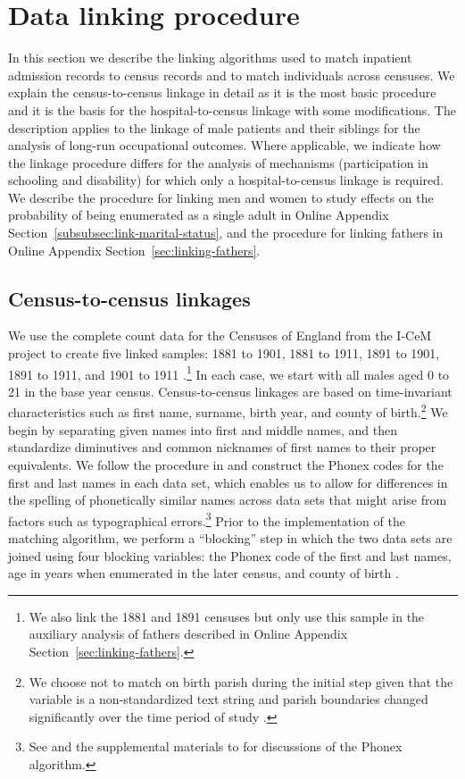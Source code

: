 \documentclass[12pt,english]{article}
\begin{document}
\section{Data linking procedure\label{sec:linking-procedure}}

In this section we describe the linking algorithms used to match inpatient admission records to census records and to match individuals across censuses. We explain the census-to-census linkage in detail as it is the most basic procedure and it is the basis for the hospital-to-census linkage with some modifications. The description applies to the linkage of male patients and their siblings for the analysis of long-run occupational outcomes. Where applicable, we indicate how the linkage procedure differs for the analysis of mechanisms (participation in schooling and disability) for which only a hospital-to-census linkage is required. We describe the procedure for linking men and women to study effects on the probability of being enumerated as a single adult in Online Appendix Section~\ref{subsubsec:link-marital-status}, and the procedure for linking fathers in Online Appendix Section~\ref{sec:linking-fathers}.

\subsection[Census-to-census linkages]{Census-to-census linkages\label{sec:linking-census-census}}

We use the complete count data for the Censuses of England from the I-CeM project to create five linked samples: 1881 to 1901, 1881 to 1911, 1891 to 1901, 1891 to 1911, and 1901 to 1911 \citep{SchurerHiggs2020,SchurerHiggs2022}.\footnote{We also link the 1881 and 1891 censuses but only use this sample in the auxiliary analysis of fathers described in Online Appendix Section~\ref{sec:linking-fathers}.} In each case, we start with all males aged 0 to 21 in the base year census. Census-to-census linkages are based on time-invariant characteristics such as first name, surname, birth year, and county of birth.\footnote{We choose not to match on birth parish during the initial step given that the variable is a non-standardized text string and parish boundaries changed significantly over the time period of study \citep{SchurerDay2019}.} We begin by separating given names into first and middle names, and then standardize diminutives and common nicknames of first names to their proper equivalents. We follow the procedure in \cite{Parman2015-EEH} and construct the Phonex codes for the first and last names in each data set, which enables us to allow for differences in the spelling of phonetically similar names across data sets that might arise from factors such as typographical errors.\footnote{See \cite{DahisNixQian2020} and the supplemental materials to \cite{Parman2015-EEH} for discussions of the Phonex algorithm.} Prior to the implementation of the matching algorithm, we perform a ``blocking'' step in which the two data sets are joined using four blocking variables: the Phonex code of the first and last names, age in years when enumerated in the later census, and county of birth \citep{Christen2012}. 
\end{document}

